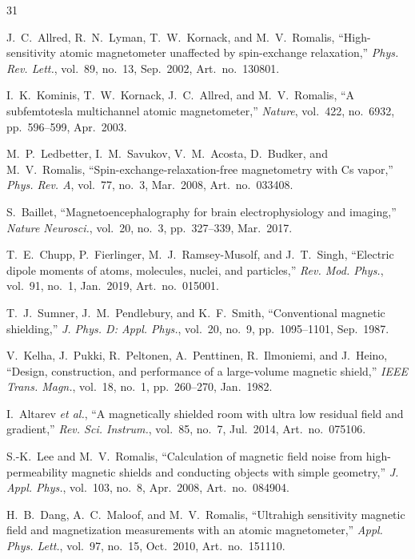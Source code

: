 ﻿\documentclass[letterpaper,journal]{IEEEtran}
\begin{document}
\begin{thebibliography}{31}

J.~C.~Allred, R.~N.~Lyman, T.~W.~Kornack, and M.~V.~Romalis,
``High-sensitivity atomic magnetometer unaffected by spin-exchange relaxation,''
\textit{Phys. Rev. Lett.}, vol.~89, no.~13, Sep.~2002, Art.~no.~130801.

I.~K.~Kominis, T.~W.~Kornack, J.~C.~Allred, and M.~V.~Romalis,
``A subfemtotesla multichannel atomic magnetometer,''
\textit{Nature}, vol.~422, no.~6932, pp.~596--599, Apr.~2003.

M.~P.~Ledbetter, I.~M.~Savukov, V.~M.~Acosta, D.~Budker, and M.~V.~Romalis,
``Spin-exchange-relaxation-free magnetometry with Cs vapor,''
\textit{Phys. Rev. A}, vol.~77, no.~3, Mar.~2008, Art.~no.~033408.

S.~Baillet,
``Magnetoencephalography for brain electrophysiology and imaging,''
\textit{Nature Neurosci.}, vol.~20, no.~3, pp.~327--339, Mar.~2017.

T.~E.~Chupp, P.~Fierlinger, M.~J.~Ramsey-Musolf, and J.~T.~Singh,
``Electric dipole moments of atoms, molecules, nuclei, and particles,''
\textit{Rev. Mod. Phys.}, vol.~91, no.~1, Jan.~2019, Art.~no.~015001.

T.~J.~Sumner, J.~M.~Pendlebury, and K.~F.~Smith,
``Conventional magnetic shielding,''
\textit{J. Phys. D: Appl. Phys.}, vol.~20, no.~9, pp.~1095--1101, Sep.~1987.

V.~Kelha, J.~Pukki, R.~Peltonen, A.~Penttinen, R.~Ilmoniemi, and J.~Heino,
``Design, construction, and performance of a large-volume magnetic shield,''
\textit{IEEE Trans. Magn.}, vol.~18, no.~1, pp.~260--270, Jan.~1982.

I.~Altarev \textit{et al.},
``A magnetically shielded room with ultra low residual field and gradient,''
\textit{Rev. Sci. Instrum.}, vol.~85, no.~7, Jul.~2014, Art.~no.~075106.

S.-K.~Lee and M.~V.~Romalis,
``Calculation of magnetic field noise from high-permeability magnetic shields and conducting objects with simple geometry,''
\textit{J. Appl. Phys.}, vol.~103, no.~8, Apr.~2008, Art.~no.~084904.

H.~B.~Dang, A.~C.~Maloof, and M.~V.~Romalis,
``Ultrahigh sensitivity magnetic field and magnetization measurements with an atomic magnetometer,''
\textit{Appl. Phys. Lett.}, vol.~97, no.~15, Oct.~2010, Art.~no.~151110.


\end{thebibliography}
\end{document}
